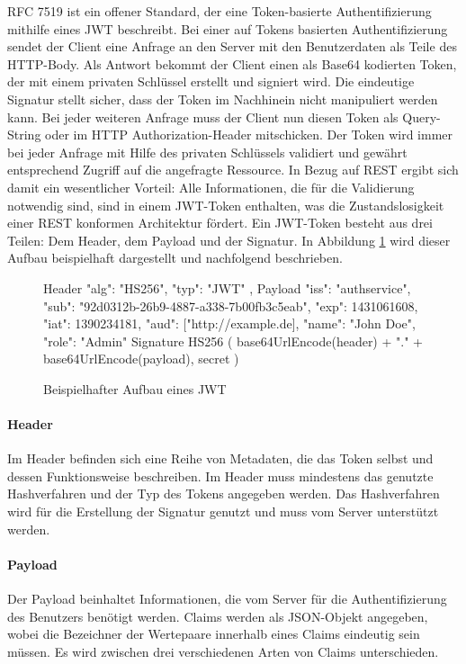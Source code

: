 \ac{RFC} 7519 ist ein offener Standard, der eine Token-basierte Authentifizierung mithilfe eines \ac{JWT} beschreibt. Bei einer auf Tokens basierten Authentifizierung sendet der Client eine Anfrage an den Server mit den Benutzerdaten als Teile des HTTP-Body. Als Antwort bekommt der Client einen als \mbox{Base64} kodierten Token, der mit einem privaten Schlüssel erstellt und signiert wird. Die eindeutige Signatur stellt sicher, dass der Token im Nachhinein nicht manipuliert werden kann. Bei jeder weiteren Anfrage muss der Client nun diesen Token als Query-String oder im \ac{HTTP} Authorization-Header mitschicken. Der Token wird immer bei jeder Anfrage mit Hilfe des privaten Schlüssels validiert und gewährt entsprechend Zugriff auf die angefragte Ressource. In Bezug auf \ac{REST} ergibt sich damit ein wesentlicher Vorteil: Alle Informationen, die für die Validierung notwendig sind, sind in einem \ac{JWT}-Token enthalten, was die Zustandslosigkeit einer REST konformen Architektur fördert. \parencite[vgl.][13]{RFC7519} Ein \ac{JWT}-Token besteht aus drei Teilen: Dem Header, dem Payload und der Signatur. In Abbildung \ref{prog:jwtstructure} wird dieser Aufbau beispielhaft dargestellt und nachfolgend beschrieben.

\begin{figure}[H]
\begin{GenericCode}[numbers=none]
Header
{
    "alg": "HS256",
    "typ": "JWT"
},
Payload
{
    "iss": "authservice",
    "sub": "92d0312b-26b9-4887-a338-7b00fb3c5eab",
    "exp": 1431061608,
    "iat": 1390234181,
    "aud": ["http://example.de],
    "name": "John Doe",
    "role":	"Admin"
}
Signature 
{
	HS256
    (
      base64UrlEncode(header) + "." + 
      base64UrlEncode(payload), 
      secret
    )
}
\end{GenericCode}
\caption{Beispielhafter Aufbau eines \acf{JWT}}
\label{prog:jwtstructure}
\end{figure}

\paragraph{Header} Im Header befinden sich eine Reihe von Metadaten, die das Token selbst und dessen Funktionsweise beschreiben. Im Header muss mindestens das genutzte Hashverfahren und der Typ des Tokens angegeben werden. Das Hashverfahren wird für die Erstellung der Signatur genutzt und muss vom Server unterstützt werden.

\paragraph{Payload} Der Payload beinhaltet Informationen, die vom Server für die Authentifizierung des Benutzers benötigt werden. Claims werden als JSON-Objekt angegeben, wobei die Bezeichner der Wertepaare innerhalb eines Claims eindeutig sein müssen. Es wird zwischen drei verschiedenen Arten von Claims unterschieden.

